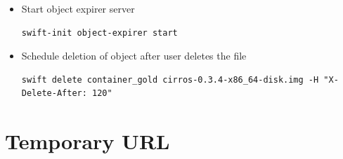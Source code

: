 \documentclass{article}
\begin{document}
\begin{itemize}
\item Start object expirer server

\begin{verbatim}
swift-init object-expirer start
\end{verbatim}

\item Schedule deletion of object after user deletes the file

\begin{verbatim}
swift delete container_gold cirros-0.3.4-x86_64-disk.img -H "X-Delete-After: 120"
\end{verbatim}
\end{itemize}

\section{Temporary URL}
\label{sec:org811ddaa}
\end{document}
